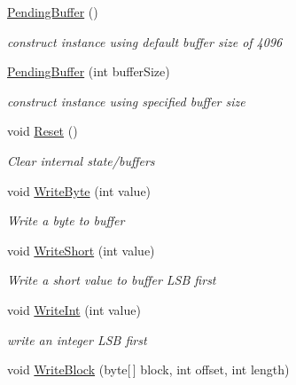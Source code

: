 \begin{DoxyCompactItemize}
\hyperlink{class_i_c_sharp_code_1_1_sharp_zip_lib_1_1_zip_1_1_compression_1_1_pending_buffer_a1321c17e1246bfd949be6931cadef03d}{Pending\+Buffer} ()
\begin{DoxyCompactList}\small\item\em construct instance using default buffer size of 4096 \end{DoxyCompactList}\item 
\hyperlink{class_i_c_sharp_code_1_1_sharp_zip_lib_1_1_zip_1_1_compression_1_1_pending_buffer_a3097cb51b8024964380e603c82ced157}{Pending\+Buffer} (int buffer\+Size)
\begin{DoxyCompactList}\small\item\em construct instance using specified buffer size \end{DoxyCompactList}\item 
void \hyperlink{class_i_c_sharp_code_1_1_sharp_zip_lib_1_1_zip_1_1_compression_1_1_pending_buffer_a29fb607f934954a99eac571e1bd703b4}{Reset} ()
\begin{DoxyCompactList}\small\item\em Clear internal state/buffers \end{DoxyCompactList}\item 
void \hyperlink{class_i_c_sharp_code_1_1_sharp_zip_lib_1_1_zip_1_1_compression_1_1_pending_buffer_a4eca88699314f9875c3ba116676814f3}{Write\+Byte} (int value)
\begin{DoxyCompactList}\small\item\em Write a byte to buffer \end{DoxyCompactList}\item 
void \hyperlink{class_i_c_sharp_code_1_1_sharp_zip_lib_1_1_zip_1_1_compression_1_1_pending_buffer_a639060dd1e220e5106bd3e285d0cf3b0}{Write\+Short} (int value)
\begin{DoxyCompactList}\small\item\em Write a short value to buffer L\+SB first \end{DoxyCompactList}\item 
void \hyperlink{class_i_c_sharp_code_1_1_sharp_zip_lib_1_1_zip_1_1_compression_1_1_pending_buffer_ae345066eaba7f773529fff6780b5c922}{Write\+Int} (int value)
\begin{DoxyCompactList}\small\item\em write an integer L\+SB first \end{DoxyCompactList}\item 
void \hyperlink{class_i_c_sharp_code_1_1_sharp_zip_lib_1_1_zip_1_1_compression_1_1_pending_buffer_ae263d7650c03a8cbeb4ba1aa69727da4}{Write\+Block} (byte\mbox{[}$\,$\mbox{]} block, int offset, int length)

\end{DoxyCompactItemize}
